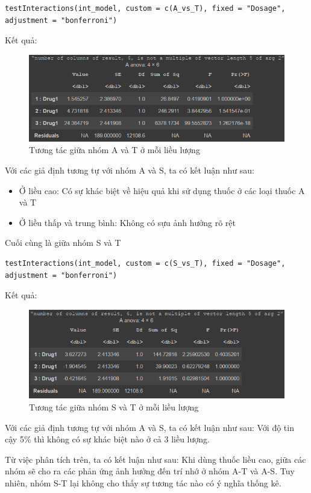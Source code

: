 \begin{itemize}
\begin{itemize}
        \begin{lstlisting}
testInteractions(int_model, custom = c(A_vs_T), fixed = "Dosage", adjustment = "bonferroni")
        \end{lstlisting}
        Kết quả:
        \begin{figure}[H]
            \centering
            \includegraphics[width=0.8\linewidth]{part01_figures/11.png}
            \caption{Tương tác giữa nhóm A và T ở mỗi liều lượng}
            \label{fig:Tương tác giữa nhóm A và T ở mỗi liều lượng}
        \end{figure}
        Với các giả định tương tự với nhóm A và S, ta có kết luận như sau:
        \begin{itemize}
            \item Ở liều cao: Có sự khác biệt về hiệu quả khi sử dụng thuốc ở các  loại thuốc A và T
            \item Ở liều thấp và trung bình: Không có sựu ảnh hưởng rõ rệt
        \end{itemize}
        Cuối cùng là giữa nhóm S và T
        \begin{lstlisting}
testInteractions(int_model, custom = c(S_vs_T), fixed = "Dosage", adjustment = "bonferroni")
        \end{lstlisting}
        Kết quả:
        \begin{figure}[H]
            \centering
            \includegraphics[width=0.8\linewidth]{part01_figures/12.png}
            \caption{Tương tác giữa nhóm S và T ở mỗi liều lượng}
            \label{fig:Tương tác giữa nhóm S và T ở mỗi liều lượng}
        \end{figure}
         Với các giả định tương tự với nhóm A và S, ta có kết luận như sau: Với độ tin cậy 5\% thì không có sự khác biệt nào ở cả 3 liều lượng.
    \end{itemize}
    Từ việc phân tích trên, ta có kết luận như sau: Khi dùng thuốc liều cao, giữa các nhóm sẽ cho ra các phản ứng ảnh hưởng đến trí nhớ ở nhóm A-T và A-S. Tuy nhiên, nhóm S-T lại không cho thấy sự tương tác nào có ý nghĩa thống kê.


\end{itemize}
